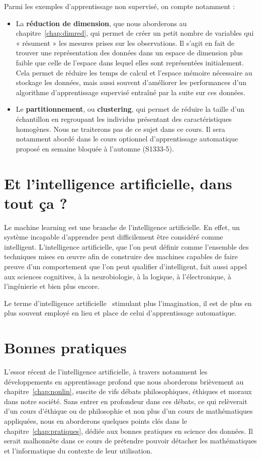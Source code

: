 Parmi les exemples d'apprentissage non supervisé, on compte notamment :
\begin{itemize}
	\item La \textbf{réduction de dimension}, que nous aborderons au
	chapitre~\ref{chap:dimred}, qui permet de créer un petit nombre de variables
	qui « résument » les mesures prises sur les observations. Il s'agit en fait de trouver
	une représentation des données dans un espace de dimension plus faible que
	celle de l'espace dans lequel elles sont représentées initialement. Cela
	permet de réduire les temps de calcul et l'espace mémoire nécessaire au
	stockage les données, mais aussi souvent d'améliorer les performances d'un
	algorithme d'apprentissage supervisé entraîné par la suite sur ces données.
	\item Le \textbf{partitionnement}, ou \textbf{clustering}, qui permet de
	réduire la taille d'un échantillon en regroupant les individus présentant des
	caractéristiques homogènes. Nous ne traiterons pas de ce sujet dans ce
	cours. Il sera notamment abordé dans le cours optionnel d'apprentissage
	automatique proposé en semaine bloquée à l'automne (S1333-5).
\end{itemize}


\section{Et l'intelligence artificielle, dans tout ça ?}
Le machine learning est une branche de l'intelligence
artificielle. En effet, un système incapable d'apprendre peut difficilement
être considéré comme intelligent. 
L'intelligence artificielle, que l'on peut définir comme l'ensemble des techniques mises en
{\oe}uvre afin de construire des machines capables de faire preuve d'un
comportement que l'on peut qualifier d'intelligent, fait aussi appel aux
sciences cognitives, à la neurobiologie, à la logique, à l'électronique, à
l'ingénierie et bien plus encore.

Le terme d'\og intelligence artificielle \fg~stimulant plus
l'imagination, il est de plus en plus souvent employé en lieu et
place de celui d'apprentissage automatique.

\section{Bonnes pratiques}
L'essor récent de l'intelligence artificielle, à travers notamment les
développements en apprentissage profond que nous aborderons brièvement au
chapitre~\ref{chap:nonlin}, suscite de vifs débats philosophiques, éthiques et
moraux dans notre société. Sans entrer en profondeur dans ces débats, ce qui
relèverait d'un cours d'éthique ou de philosophie et non plus d'un cours de
mathématiques appliquées, nous en aborderons quelques points clés dans le
chapitre~\ref{chap:pratiques}, dédiée aux bonnes pratiques en science des
données. Il serait malhonnête dans ce cours de prétendre pouvoir
détacher les mathématiques et l'informatique du contexte de leur utilisation.


